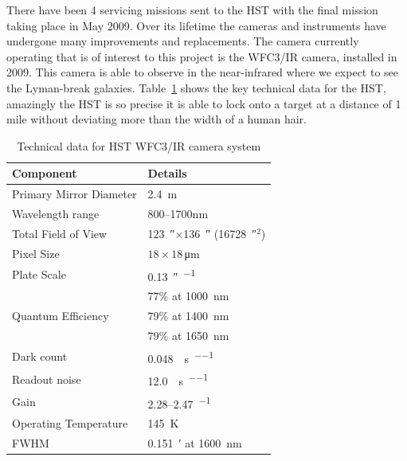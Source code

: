 		There have been 4 servicing missions sent to the HST with the final mission taking place in May 2009. Over its lifetime the cameras and instruments have undergone many improvements and replacements. The camera currently operating that is of interest to this project is the WFC3/IR camera, installed in 2009. This camera is able to observe in the near-infrared where we expect to see the Lyman-break galaxies. Table~\ref{tab:HST_technical} shows the key technical data for the HST, amazingly the HST is so precise it is able to lock onto a target at a distance of 1 mile without deviating more than the width of a human hair.
		\begin{table}[htbp]
			\begin{center}
				\begin{tabular}{l|l}
					Component	& 	Details \\
					\hline\hline
					Primary Mirror Diameter & \SI{2.4}{\metre} \\ \hline
					Wavelength range & 800--1700\si{\nano\metre} \\ \hline
					Total Field of View & \SI{123}{\arcsecond}$\times$\SI{136}{\arcsecond} (\SI{16728}{\arcsecond}$^2$) \\ \hline
					Pixel Size & $18\times18$\,\si{\micro\metre} \\ \hline
					Plate Scale & \SI{0.13}{\arcsecond\per\pixel} \\ \hline
					\multirow{3}{*}{Quantum Efficiency} & 77\% at \SI{1000}{\nano\metre}\\
					 & 79\% at \SI{1400}{\nano\metre}\\
					 & 79\% at \SI{1650}{\nano\metre}\\ \hline
					Dark count &  \SI{0.048}{\electron\per\second\per\pixel} \\ \hline
					Readout noise & \SI{12.0}{\electron\per\second\per\pixel} \\ \hline
					Gain & 2.28--2.47\si{\electron\per\ADU} \\ \hline
					Operating Temperature & \SI{145}{\kelvin} \\ \hline
					FWHM & \SI{0.151}{\arcminute} at \SI{1600}{\nano\metre}
				\end{tabular}
			\end{center}
			\caption{Technical data for HST WFC3/IR camera system\cite{WFC3_IHB}}
		\label{tab:HST_technical}
		\end{table}

